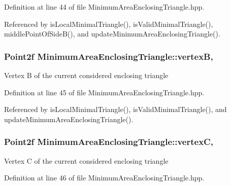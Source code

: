 Definition at line 44 of file Minimum\-Area\-Enclosing\-Triangle.\-hpp.



Referenced by is\-Local\-Minimal\-Triangle(), is\-Valid\-Minimal\-Triangle(), middle\-Point\-Of\-Side\-B(), and update\-Minimum\-Area\-Enclosing\-Triangle().

\hypertarget{classmultiscale_1_1MinimumAreaEnclosingTriangle_af54ab74d9af976d7308463a334ae1dda}{
\subsubsection[{vertex\-B}]{\setlength{\rightskip}{0pt plus 5cm}Point2f Minimum\-Area\-Enclosing\-Triangle\-::vertex\-B\hspace{0.3cm}{\ttfamily [static]}, {\ttfamily [private]}}}\label{classmultiscale_1_1MinimumAreaEnclosingTriangle_af54ab74d9af976d7308463a334ae1dda}
Vertex B of the current considered enclosing triangle 

Definition at line 45 of file Minimum\-Area\-Enclosing\-Triangle.\-hpp.



Referenced by is\-Local\-Minimal\-Triangle(), is\-Valid\-Minimal\-Triangle(), and update\-Minimum\-Area\-Enclosing\-Triangle().

\hypertarget{classmultiscale_1_1MinimumAreaEnclosingTriangle_a57010dcbfa3ff916815df80663f704bc}{
\subsubsection[{vertex\-C}]{\setlength{\rightskip}{0pt plus 5cm}Point2f Minimum\-Area\-Enclosing\-Triangle\-::vertex\-C\hspace{0.3cm}{\ttfamily [static]}, {\ttfamily [private]}}}\label{classmultiscale_1_1MinimumAreaEnclosingTriangle_a57010dcbfa3ff916815df80663f704bc}
Vertex C of the current considered enclosing triangle 

Definition at line 46 of file Minimum\-Area\-Enclosing\-Triangle.\-hpp.



